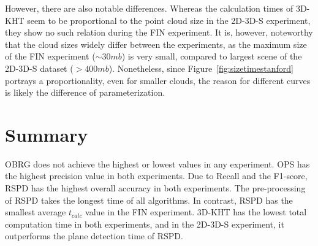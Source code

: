 \documentclass[main.tex]{subfiles}
\begin{document}
However, there are also notable differences.
Whereas the calculation times of 3D-KHT seem to be proportional to the point cloud size in the 2D-3D-S experiment, they show no such
relation during the FIN experiment. It is, however, noteworthy that the cloud sizes widely differ between the experiments, as the
maximum size of the FIN experiment (${\sim}30mb$) is very small, compared to largest scene of the 2D-3D-S dataset (${>}400mb$).
Nonetheless, since Figure~\ref{fig:sizetimestanford} portrays a proportionality, even for smaller clouds, the reason for
different curves is likely the difference of parameterization.

\section{Summary}
OBRG does not achieve the highest or lowest values in any experiment.
OPS has the highest precision value in both experiments.
Due to Recall and the F1-score, RSPD has the highest overall accuracy in both experiments.
The pre-processing of RSPD takes the longest time of all algorithms. In contrast, RSPD has the smallest average $t_{calc}$
value in the FIN experiment. 3D-KHT has the lowest total computation time in both experiments, and in the 2D-3D-S experiment,
it outperforms the plane detection time of RSPD.


\end{document}
